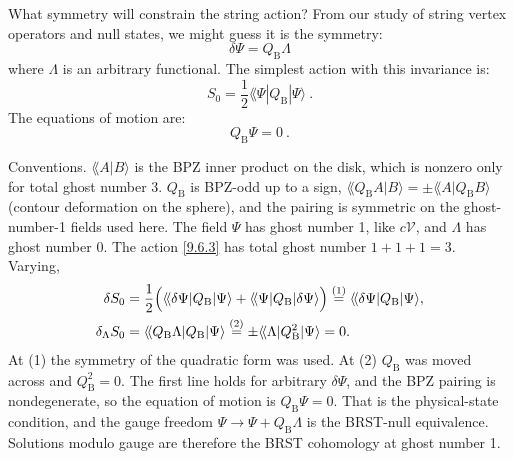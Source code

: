What symmetry will constrain the string action? From our study of string vertex operators and null states, we might guess it is the symmetry:
\begin{equation}
	\delta \Psi=Q_{\mathrm{B}} \Lambda \label{9.6.2}
\end{equation}
where $\Lambda$ is an arbitrary functional. The simplest action with this invariance is:
\begin{equation}
	S_{0}=\frac{1}{2}\lAngle\Psi |Q_{\mathrm{B}}| \Psi\rangle \:. \label{9.6.3}
\end{equation}
The equations of motion are:
\begin{equation}
	Q_{\mathrm{B}} \Psi=0 \:. \label{9.6.4}
\end{equation}
\begin{tcolorbox}[breakable]
	\begin{remark}
		Conventions. $\lAngle A|B\rangle$ is the BPZ inner product on the disk, which is nonzero only for total ghost number $3$. $Q_{\mathrm B}$ is BPZ-odd up to a sign, $\lAngle Q_{\mathrm B}A|B\rangle=\pm\lAngle A|Q_{\mathrm B}B\rangle$ (contour deformation on the sphere), and the pairing is symmetric on the ghost-number-1 fields used here. The field $\Psi$ has ghost number 1, like $c\mathscr V$, and $\Lambda$ has ghost number 0. The action \eqref{9.6.3} has total ghost number $1+1+1=3$. Varying,
		\begin{align*}
			\delta S_0&=\frac12\Bigl(\langle\!\langle\delta\Psi|Q_{\mathrm B}|\Psi\rangle+\langle\!\langle\Psi|Q_{\mathrm B}|\delta\Psi\rangle\Bigr)\overset{(1)}{=}\langle\!\langle\delta\Psi|Q_{\mathrm B}|\Psi\rangle ,\\
			\delta_\Lambda S_0&=\langle\!\langle Q_{\mathrm B}\Lambda|Q_{\mathrm B}|\Psi\rangle\overset{(2)}{=}\pm\langle\!\langle\Lambda|Q_{\mathrm B}^2|\Psi\rangle=0 .
		\end{align*}
		At (1) the symmetry of the quadratic form was used. At (2) $Q_{\mathrm B}$ was moved across and $Q_{\mathrm B}^2=0$. The first line holds for arbitrary $\delta\Psi$, and the BPZ pairing is nondegenerate, so the equation of motion is $Q_{\mathrm B}\Psi=0$. That is the physical-state condition, and the gauge freedom $\Psi\to\Psi+Q_{\mathrm B}\Lambda$ is the BRST-null equivalence. Solutions modulo gauge are therefore the BRST cohomology at ghost number 1.
	\end{remark}
\end{tcolorbox}

